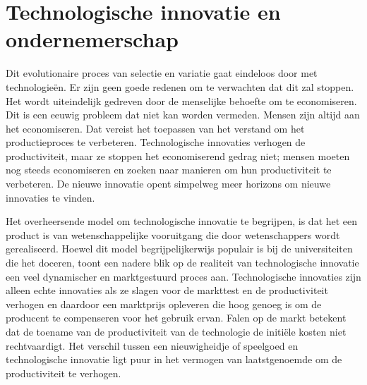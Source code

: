 \documentclass[
  a5paper,
  smalldemyvopaper,11pt,twoside,onecolumn,openright,extrafontsizes,
hidelinks]{memoir}
\begin{document}
\section{Technologische innovatie en
ondernemerschap}\label{technologische-innovatie-en-ondernemerschap}

Dit evolutionaire proces van selectie en variatie gaat eindeloos door
met technologieën. Er zijn geen goede redenen om te verwachten dat dit
zal stoppen. Het wordt uiteindelijk gedreven door de menselijke behoefte
om te economiseren. Dit is een eeuwig probleem dat niet kan worden
vermeden. Mensen zijn altijd aan het economiseren. Dat vereist het
toepassen van het verstand om het productieproces te verbeteren.
Technologische innovaties verhogen de productiviteit, maar ze stoppen
het economiserend gedrag niet; mensen moeten nog steeds economiseren en
zoeken naar manieren om hun productiviteit te verbeteren. De nieuwe
innovatie opent simpelweg meer horizons om nieuwe innovaties te vinden.

Het overheersende model om technologische innovatie te begrijpen, is dat
het een product is van wetenschappelijke vooruitgang die door
wetenschappers wordt gerealiseerd. Hoewel dit model begrijpelijkerwijs
populair is bij de universiteiten die het doceren, toont een nadere blik
op de realiteit van technologische innovatie een veel dynamischer en
marktgestuurd proces aan. Technologische innovaties zijn alleen echte
innovaties als ze slagen voor de markttest en de productiviteit verhogen
en daardoor een marktprijs opleveren die hoog genoeg is om de producent
te compenseren voor het gebruik ervan. Falen op de markt betekent dat de
toename van de productiviteit van de technologie de initiële kosten niet
rechtvaardigt. Het verschil tussen een nieuwigheidje of speelgoed en
technologische innovatie ligt puur in het vermogen van laatstgenoemde om
de productiviteit te verhogen.
\end{document}
